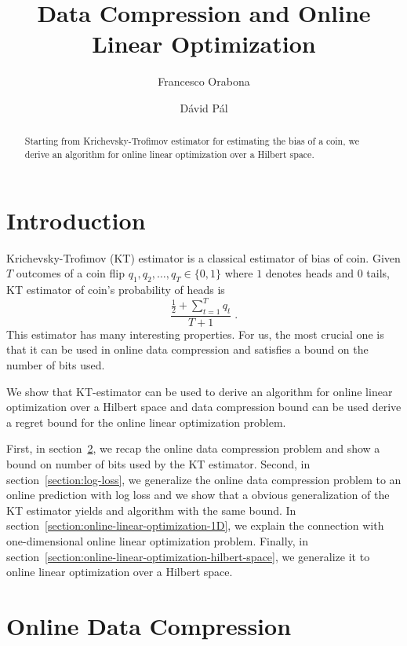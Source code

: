 \documentclass{article}
\begin{document}
\title{Data Compression and Online Linear Optimization}
\author{Francesco Orabona \and D\'avid P\'al}

\maketitle

\begin{abstract}
Starting from Krichevsky-Trofimov estimator for estimating
the bias of a coin, we derive an algorithm for online linear
optimization over a Hilbert space.
\end{abstract}

\section{Introduction}

Krichevsky-Trofimov (KT) estimator is a classical estimator of bias of coin.
Given $T$ outcomes of a coin flip $q_1, q_2, \dots, q_T \in \{0,1\}$ where $1$
denotes heads and $0$ tails, KT estimator of coin's probability of heads is
$$
\frac{\frac{1}{2} + \sum_{t=1}^T q_t}{T + 1} \; .
$$
This estimator has many interesting properties. For us, the most crucial one is
that it can be used in online data compression and satisfies a bound on the
number of bits used.

We show that KT-estimator can be used to derive an algorithm for online linear
optimization over a Hilbert space and data compression bound can be used derive
a regret bound for the online linear optimization problem.

First, in section~\ref{section:online-data-compression}, we recap the online
data compression problem and show a bound on number of bits used by the KT
estimator.  Second, in section~\ref{section:log-loss}, we generalize the online
data compression problem to an online prediction with log loss and we show that
a obvious generalization of the KT estimator yields and algorithm with the same
bound. In section~\ref{section:online-linear-optimization-1D}, we explain the
connection with one-dimensional online linear optimization problem.
Finally, in section~\ref{section:online-linear-optimization-hilbert-space},
we generalize it to online linear optimization over a Hilbert space.

\section{Online Data Compression}
\label{section:online-data-compression}
\end{document}
